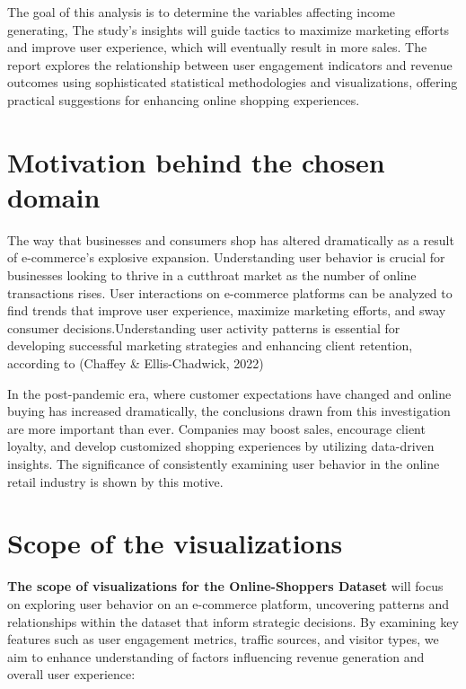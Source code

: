 \documentclass[12pt]{article}
\begin{document}
The goal of this analysis is to determine the variables affecting income generating, The study's insights will guide tactics to maximize marketing efforts and improve user experience, which will eventually result in more sales. The report explores the relationship between user engagement indicators and revenue outcomes using sophisticated statistical methodologies and visualizations, offering practical suggestions for enhancing online shopping experiences.

\section{Motivation behind the chosen domain}
The way that businesses and consumers shop has altered dramatically as a result of e-commerce's explosive expansion. Understanding user behavior is crucial for businesses looking to thrive in a cutthroat market as the number of online transactions rises. User interactions on e-commerce platforms can be analyzed to find trends that improve user experience, maximize marketing efforts, and sway consumer decisions.Understanding user activity patterns is essential for developing successful marketing strategies and enhancing client retention, according to (Chaffey & Ellis-Chadwick, 2022) \cite{Chaffey}


In the post-pandemic era, where customer expectations have changed and online buying has increased dramatically, the conclusions drawn from this investigation are more important than ever. Companies may boost sales, encourage client loyalty, and develop customized shopping experiences by utilizing data-driven insights. The significance of consistently examining user behavior in the online retail industry is shown by this motive.

\section{Scope of the visualizations}
\textbf{The scope of visualizations for the Online-Shoppers Dataset} will focus on exploring  user behavior on an e-commerce platform, uncovering patterns and relationships within the dataset that inform strategic decisions. By examining key features such as user engagement metrics, traffic sources, and visitor types, we aim to enhance understanding of factors influencing revenue generation and overall user experience:
\end{document}
